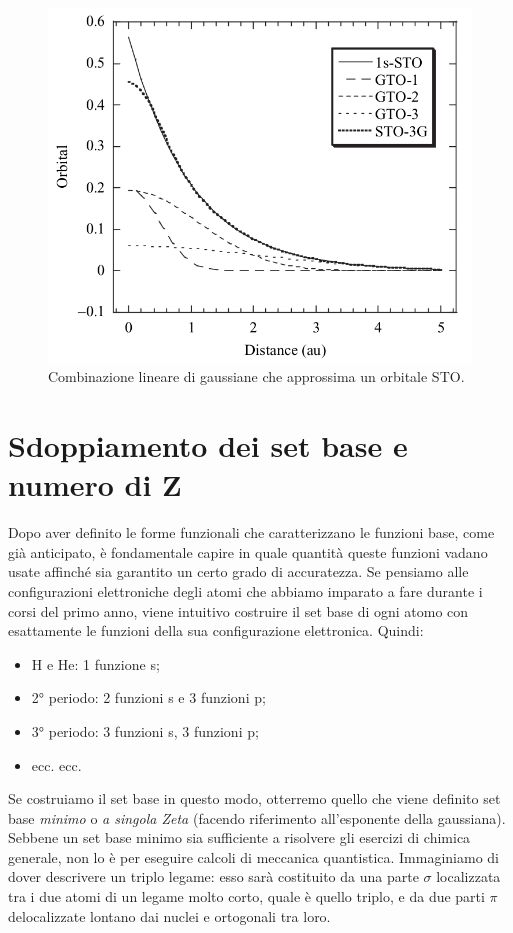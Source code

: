 \documentclass[oneside]{amsbook}
\numberwithin{section}{chapter}
\numberwithin{equation}{section}
\numberwithin{figure}{section}
\begin{document}
\begin{figure}[H]
\centering
\caption{Combinazione lineare di gaussiane che approssima un orbitale STO.}\label{sto}
\includegraphics[scale=0.3]{sto}
\end{figure}


\section{Sdoppiamento dei set base e numero di Z}
Dopo aver definito le forme funzionali che caratterizzano le funzioni base, come già anticipato, è fondamentale capire in quale quantità queste funzioni vadano usate affinché sia garantito un certo grado di accuratezza.
Se pensiamo alle configurazioni elettroniche degli atomi che abbiamo imparato a fare durante i corsi del primo anno, viene intuitivo costruire il set base di ogni atomo con esattamente le funzioni della sua configurazione elettronica. Quindi:
\begin{itemize}
\item H e He: 1 funzione s;
\item 2° periodo: 2 funzioni s e 3 funzioni p;
\item 3° periodo: 3 funzioni s, 3 funzioni p;
\item ecc. ecc.
\end{itemize}
Se costruiamo il set base in questo modo, otterremo quello che viene definito set base \emph{minimo} o \emph{a singola Zeta} (facendo riferimento all'esponente della gaussiana). Sebbene un set base minimo sia sufficiente a risolvere gli esercizi di chimica generale, non lo è per eseguire calcoli di meccanica quantistica. Immaginiamo di dover descrivere un triplo legame: esso sarà costituito da una parte $\sigma$ localizzata tra i due atomi di un legame molto corto, quale è quello triplo, e da  due parti $\pi$ delocalizzate lontano dai nuclei e ortogonali tra loro.
\end{document}
